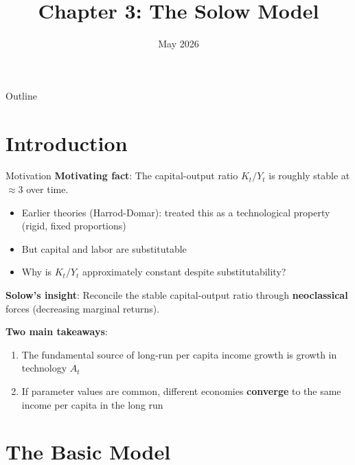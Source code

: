 \documentclass[blue]{beamer}
\title[Chapter3]{Chapter 3: The Solow Model}
\author[]{}
\date[May 2026]{May 2026}
\begin{document}
  \frame
  {
    \titlepage
  }


\begin{frame}{Outline}
	\tableofcontents
\end{frame}
\section{Introduction}

\begin{frame}{Motivation}
	\textbf{Motivating fact}: The capital-output ratio $K_t/Y_t$ is roughly stable at $\approx 3$ over time.
	\begin{itemize}
		\item Earlier theories (Harrod-Domar): treated this as a technological property (rigid, fixed proportions)
		\item But capital and labor are substitutable
		\item Why is $K_t/Y_t$ approximately constant despite substitutability?
	\end{itemize}
	
	\textbf{Solow's insight}: Reconcile the stable capital-output ratio  through \textbf{neoclassical} forces (decreasing marginal returns).
	

	\textbf{Two main takeaways}:
	\vspace{-6pt}
	\begin{enumerate}
		\item The fundamental source of long-run per capita income growth is growth in technology $A_t$
		\item If parameter values are common, different economies \textbf{converge} to the same income per capita in the long run
	\end{enumerate}
\end{frame}

\section{The Basic Model}
\end{document}
